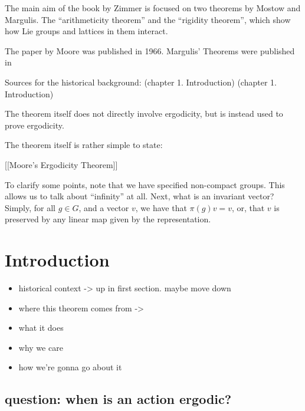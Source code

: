 \documentclass[
]{article}
\theoremstyle{break}
\theoremstyle{plain}
\begin{document}
The main aim of the book by Zimmer is focused on two
theorems by Mostow and Margulis. The ``arithmeticity theorem'' and the
``rigidity theorem'', which show how Lie groups and lattices in them
interact. 


The paper by Moore \cite{Moore66} was published in 1966. Margulis' Theorems were published in 

Sources for the historical background: \cite{mackey74}(chapter 1.
Introduction) \cite{Zimmer84}(chapter 1. Introduction)

The theorem itself does not directly involve ergodicity, but is instead
used to prove ergodicity.

The theorem itself is rather simple to state:

{[}{[}Moore's Ergodicity Theorem{]}{]}

To clarify some points, note that we have specified non-compact groups.
This allows us to talk about ``infinity'' at all. Next, what is an
invariant vector? Simply, for all $g\in G$, and a vector $v$, we
have that $\pi(g)v = v$, or, that $v$ is preserved by any linear map
given by the representation.





\hypertarget{introduction}{\section{Introduction}\label{sec:introduction}}


\begin{itemize}
  \item historical context -\textgreater{} up in first section. maybe move down
  \item where this theorem comes from -\textgreater{} \cite{howe79}
  \item what it does
  \item why we care
  \item how we're gonna go about it
\end{itemize}

\hypertarget{question-when-is-an-action-ergodic}{%
\subsection{question: when is an action
ergodic?}\label{question-when-is-an-action-ergodic}}
\end{document}
